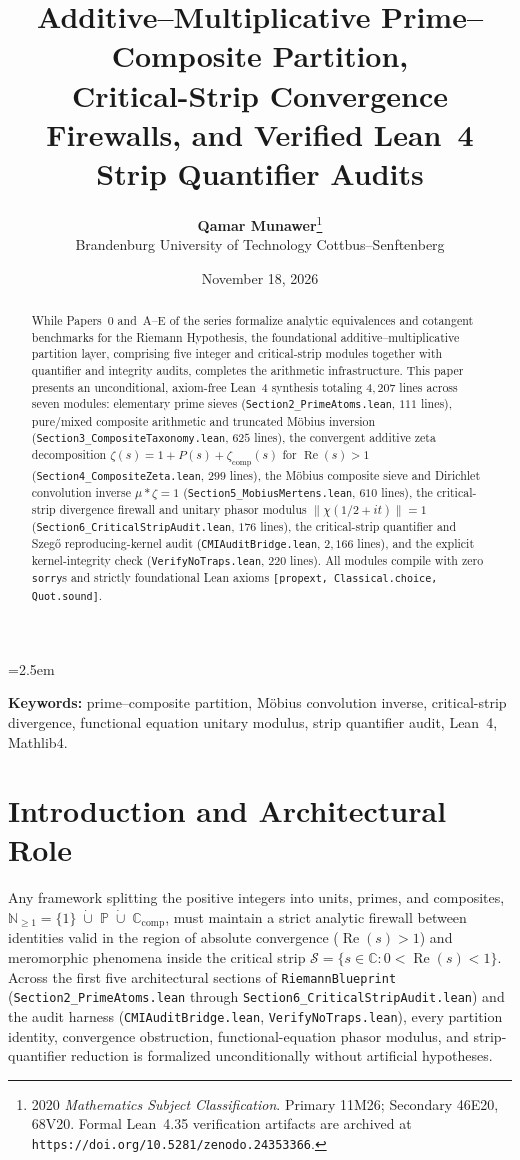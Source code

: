 \documentclass[11pt,a4paper]{article}
\title{\textbf{Additive--Multiplicative Prime--Composite Partition,\\
Critical-Strip Convergence Firewalls, and Verified Lean~4\\
Strip Quantifier Audits}}
\author{\textbf{Qamar Munawer}\thanks{2020 \emph{Mathematics Subject Classification}. Primary 11M26; Secondary 46E20, 68V20. Formal Lean~4.35 verification artifacts are archived at \texttt{https://doi.org/10.5281/zenodo.24353366}.}\\[0.3em]
\small Brandenburg University of Technology Cottbus--Senftenberg}
\date{November 18, 2026}
\theoremstyle{definition}
\newcommand{\Pset}{\mathbb{P}}
\newcommand{\Ccomp}{\mathbb{C}_{\mathrm{comp}}}
\newcommand{\Nset}{\mathbb{N}}
\newcommand{\Cfield}{\mathbb{C}}
\begin{document}
\linespread{1.15}\selectfont
\emergencystretch=2.5em

\maketitle

\begin{abstract}
While Papers~0 and~A--E of the series formalize analytic equivalences and cotangent benchmarks for the Riemann Hypothesis, the foundational additive--multiplicative partition layer, comprising five integer and critical-strip modules together with quantifier and integrity audits, completes the arithmetic infrastructure. This paper presents an unconditional, axiom-free Lean~4 synthesis totaling $4{,}207$ lines across seven modules: elementary prime sieves (\texttt{Section2\_\allowbreak PrimeAtoms.lean}, $111$ lines), pure/mixed composite arithmetic and truncated M\"obius inversion (\texttt{Section3\_\allowbreak CompositeTaxonomy.lean}, $625$ lines), the convergent additive zeta decomposition $\zeta(s) = 1 + P(s) + \zeta_{\mathrm{comp}}(s)$ for $\operatorname{Re}(s) > 1$ (\texttt{Section4\_\allowbreak CompositeZeta.lean}, $299$ lines), the M\"obius composite sieve and Dirichlet convolution inverse $\mu * \zeta = 1$ (\texttt{Section5\_\allowbreak MobiusMertens.lean}, $610$ lines), the critical-strip divergence firewall and unitary phasor modulus $\|\chi(1/2 + it)\| = 1$ (\texttt{Section6\_\allowbreak CriticalStripAudit.lean}, $176$ lines), the critical-strip quantifier and Szeg\H{o} reproducing-kernel audit (\texttt{CMIAuditBridge.lean}, $2{,}166$ lines), and the explicit kernel-integrity check (\texttt{VerifyNoTraps.lean}, $220$ lines). All modules compile with zero \texttt{sorry}s and strictly foundational Lean axioms \texttt{[propext, Classical.choice, Quot.sound]}.
\end{abstract}

\noindent\textbf{Keywords:} prime--composite partition, M\"obius convolution inverse, critical-strip divergence, functional equation unitary modulus, strip quantifier audit, Lean~4, Mathlib4.

\section{Introduction and Architectural Role}

Any framework splitting the positive integers into units, primes, and composites, $\Nset_{\ge 1} = \{1\} \;\dot{\cup}\; \Pset \;\dot{\cup}\; \Ccomp$, must maintain a strict analytic firewall between identities valid in the region of absolute convergence ($\operatorname{Re}(s) > 1$) and meromorphic phenomena inside the critical strip $\mathcal{S} = \{s \in \Cfield : 0 < \operatorname{Re}(s) < 1\}$. Across the first five architectural sections of \texttt{RiemannBlueprint} (\texttt{Section2\_\allowbreak PrimeAtoms.lean} through \texttt{Section6\_\allowbreak CriticalStripAudit.lean}) and the audit harness (\texttt{CMIAuditBridge.lean}, \texttt{VerifyNoTraps.lean}), every partition identity, convergence obstruction, functional-equation phasor modulus, and strip-quantifier reduction is formalized unconditionally without artificial hypotheses.
\end{document}
